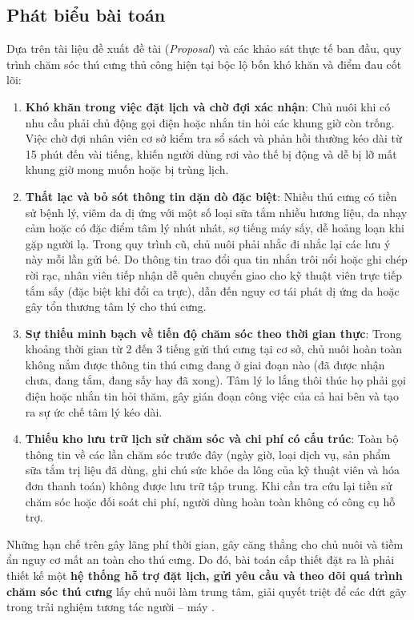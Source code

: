\subsection{Phát biểu bài toán}
Dựa trên tài liệu đề xuất đề tài (\textit{Proposal}) và các khảo sát thực tế ban đầu, quy trình chăm sóc thú cưng thủ công hiện tại bộc lộ bốn khó khăn và điểm đau cốt lõi:
\begin{enumerate}
    \item \textbf{Khó khăn trong việc đặt lịch và chờ đợi xác nhận}: Chủ nuôi khi có nhu cầu phải chủ động gọi điện hoặc nhắn tin hỏi các khung giờ còn trống. Việc chờ đợi nhân viên cơ sở kiểm tra sổ sách và phản hồi thường kéo dài từ 15 phút đến vài tiếng, khiến người dùng rơi vào thế bị động và dễ bị lỡ mất khung giờ mong muốn hoặc bị trùng lịch.
    \item \textbf{Thất lạc và bỏ sót thông tin dặn dò đặc biệt}: Nhiều thú cưng có tiền sử bệnh lý, viêm da dị ứng với một số loại sữa tắm nhiều hương liệu, da nhạy cảm hoặc có đặc điểm tâm lý nhút nhát, sợ tiếng máy sấy, dễ hoảng loạn khi gặp người lạ. Trong quy trình cũ, chủ nuôi phải nhắc đi nhắc lại các lưu ý này mỗi lần gửi bé. Do thông tin trao đổi qua tin nhắn trôi nổi hoặc ghi chép rời rạc, nhân viên tiếp nhận dễ quên chuyển giao cho kỹ thuật viên trực tiếp tắm sấy (đặc biệt khi đổi ca trực), dẫn đến nguy cơ tái phát dị ứng da hoặc gây tổn thương tâm lý cho thú cưng.
    \item \textbf{Sự thiếu minh bạch về tiến độ chăm sóc theo thời gian thực}: Trong khoảng thời gian từ 2 đến 3 tiếng gửi thú cưng tại cơ sở, chủ nuôi hoàn toàn không nắm được thông tin thú cưng đang ở giai đoạn nào (đã được nhận chưa, đang tắm, đang sấy hay đã xong). Tâm lý lo lắng thôi thúc họ phải gọi điện hoặc nhắn tin hỏi thăm, gây gián đoạn công việc của cả hai bên và tạo ra sự ức chế tâm lý kéo dài.
    \item \textbf{Thiếu kho lưu trữ lịch sử chăm sóc và chi phí có cấu trúc}: Toàn bộ thông tin về các lần chăm sóc trước đây (ngày giờ, loại dịch vụ, sản phẩm sữa tắm trị liệu đã dùng, ghi chú sức khỏe da lông của kỹ thuật viên và hóa đơn thanh toán) không được lưu trữ tập trung. Khi cần tra cứu lại tiền sử chăm sóc hoặc đối soát chi phí, người dùng hoàn toàn không có công cụ hỗ trợ.
\end{enumerate}

Những hạn chế trên gây lãng phí thời gian, gây căng thẳng cho chủ nuôi và tiềm ẩn nguy cơ mất an toàn cho thú cưng. Do đó, bài toán cấp thiết đặt ra là phải thiết kế một \textbf{hệ thống hỗ trợ đặt lịch, gửi yêu cầu và theo dõi quá trình chăm sóc thú cưng} lấy chủ nuôi làm trung tâm, giải quyết triệt để các đứt gãy trong trải nghiệm tương tác người -- máy \cite{norman2013design}.

